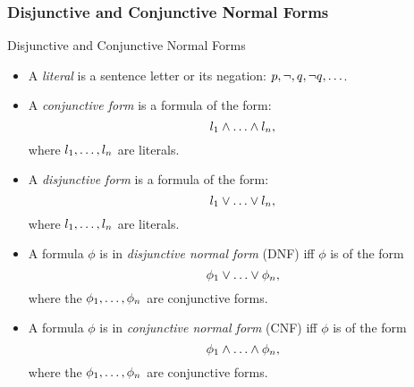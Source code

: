 \subsubsection{Disjunctive and Conjunctive Normal Forms}
\begin{frame}{Disjunctive and Conjunctive Normal Forms}

  \begin{itemize}

  \item A \emph{literal} is a sentence letter or its negation:
    $p,\neg, q, \neg q, \mathellipsis$.

   \item A \emph{conjunctive form} is a formula of the
     form: \[l_1\land \mathellipsis\land l_n,\] where $l_1,
     \mathellipsis, l_n$ are literals.

    \item  A \emph{disjunctive form} is a formula of the
     form: \[l_1\lor \mathellipsis\lor l_n,\] where $l_1,
     \mathellipsis, l_n$ are literals.

     \item A formula $\phi$ is in \emph{disjunctive
         normal form} (DNF) iff $\phi$ is of the
       form \[\phi_1\lor\mathellipsis\lor\phi_n,\] where the $\phi_1,
       \mathellipsis, \phi_n$ are conjunctive forms.

       \item A formula $\phi$ is in \emph{conjunctive
         normal form} (CNF) iff $\phi$ is of the
       form \[\phi_1\land\mathellipsis\land\phi_n,\] where the $\phi_1,
       \mathellipsis, \phi_n$ are conjunctive forms.

    
  \end{itemize}

\end{frame}

